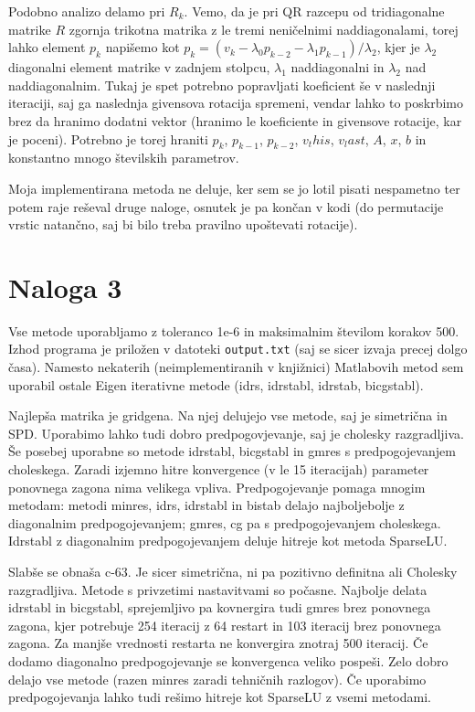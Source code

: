 \documentclass{article}
\begin{document}
    Podobno analizo delamo pri \(R_k\). Vemo, da je pri QR razcepu od tridiagonalne matrike \(R\) zgornja trikotna matrika z le tremi neničelnimi naddiagonalami, torej lahko element \(p_k\) napišemo kot \(p_k = (v_k - \lambda_0 p_{k-2} - \lambda_1 p_{k-1})/\lambda_2\), kjer je \(\lambda_2\) diagonalni element matrike v zadnjem stolpcu, \(\lambda_1\) naddiagonalni in \(\lambda_2\) nad naddiagonalnim. Tukaj je spet potrebno popravljati koeficient še v naslednji iteraciji, saj ga naslednja givensova rotacija spremeni, vendar lahko to poskrbimo brez da hranimo dodatni vektor (hranimo le koeficiente in givensove rotacije, kar je poceni). Potrebno je torej hraniti \(p_k\), \(p_{k-1}\), \(p_{k-2}\), \(v_this\), \(v_last\), \(A\), \(x\), \(b\) in konstantno mnogo številskih parametrov.

    Moja implementirana metoda ne deluje, ker sem se jo lotil pisati nespametno ter potem raje reševal druge naloge, osnutek je pa končan v kodi (do permutacije vrstic natančno, saj bi bilo treba pravilno upoštevati rotacije).


    \section{Naloga 3}
    Vse metode uporabljamo z toleranco 1e-6 in maksimalnim številom korakov 500. Izhod programa je priložen v datoteki \verb|output.txt| (saj se sicer izvaja precej dolgo časa). Namesto nekaterih (neimplementiranih v knjižnici) Matlabovih metod sem uporabil ostale Eigen iterativne metode (idrs, idrstabl, idrstab, bicgstabl).
    
    Najlepša matrika je gridgena. Na njej delujejo vse metode, saj je simetrična in SPD. Uporabimo lahko tudi dobro predpogovjevanje, saj je cholesky razgradljiva. Še posebej uporabne so metode idrstabl, bicgstabl in gmres s predpogojevanjem choleskega. Zaradi izjemno hitre konvergence (v le 15 iteracijah) parameter ponovnega zagona nima velikega vpliva. Predpogojevanje pomaga mnogim metodam: metodi minres, idrs, idrstabl in bistab delajo najboljebolje z diagonalnim predpogojevanjem; gmres, cg pa s predpogojevanjem choleskega. Idrstabl z diagonalnim predpogojevanjem deluje hitreje kot metoda SparseLU.

    Slabše se obnaša c-63. Je sicer simetrična, ni pa pozitivno definitna ali Cholesky razgradljiva. Metode s privzetimi nastavitvami so počasne. Najbolje delata idrstabl in bicgstabl, sprejemljivo pa kovnergira tudi gmres brez ponovnega zagona, kjer potrebuje 254 iteracij z 64 restart in 103 iteracij brez ponovnega zagona. Za manjše vrednosti restarta ne konvergira znotraj 500 iteracij. Če dodamo diagonalno predpogojevanje se konvergenca veliko pospeši. Zelo dobro delajo vse metode (razen minres zaradi tehničnih razlogov). Če uporabimo predpogojevanja lahko tudi rešimo hitreje kot SparseLU z vsemi metodami.
\end{document}

